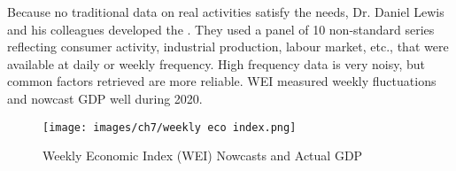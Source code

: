         Because no traditional data on real activities satisfy the needs, Dr. Daniel Lewis and his colleagues developed the . They used a panel of 10 non-standard series reflecting consumer activity, industrial production, labour market, etc., that were available at daily or weekly frequency. High frequency data is very noisy, but common factors retrieved are more reliable. WEI measured weekly fluctuations and nowcast GDP well during 2020.

        \begin{figure}[H]
            \centering
            \texttt{[image: images/ch7/weekly eco index.png]}
            \caption{Weekly Economic Index (WEI) Nowcasts and Actual GDP}
        \end{figure}
        